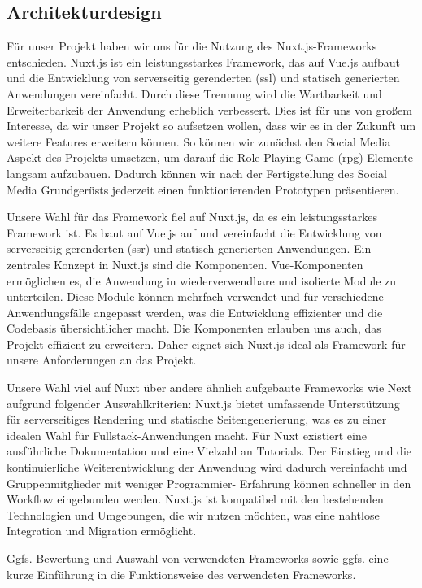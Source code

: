 \documentclass[a4paper,12pt]{article}
\begin{document}
\subsection{Architekturdesign}
Für unser Projekt haben wir uns für die Nutzung des Nuxt.js-Frameworks entschieden. Nuxt.js ist ein leistungsstarkes Framework, das auf Vue.js aufbaut und die Entwicklung von serverseitig gerenderten (\gls{ssl}) und statisch generierten Anwendungen vereinfacht. Durch diese Trennung wird die Wartbarkeit und Erweiterbarkeit der Anwendung erheblich verbessert. Dies ist für uns von großem Interesse, da wir unser Projekt so aufsetzen wollen, dass wir es in der Zukunft um weitere Features erweitern können. So können wir zunächst den Social Media Aspekt des Projekts umsetzen, um darauf die Role-Playing-Game (\gls{rpg}) Elemente langsam aufzubauen. Dadurch können wir nach der Fertigstellung des Social Media Grundgerüsts jederzeit einen funktionierenden Prototypen präsentieren.

Unsere Wahl für das Framework fiel auf Nuxt.js, da es ein leistungsstarkes Framework ist. Es baut auf Vue.js auf und vereinfacht die Entwicklung von serverseitig gerenderten (\gls{ssr}) und statisch generierten Anwendungen. Ein zentrales Konzept in Nuxt.js sind die Komponenten. Vue-Komponenten ermöglichen es, die Anwendung in wiederverwendbare und isolierte Module zu unterteilen. Diese Module können mehrfach verwendet und für verschiedene Anwendungsfälle angepasst werden, was die Entwicklung effizienter und die Codebasis übersichtlicher macht. Die Komponenten erlauben uns auch, das Projekt effizient zu erweitern. Daher eignet sich Nuxt.js ideal als Framework für unsere Anforderungen an das Projekt.

Unsere Wahl viel auf Nuxt über andere ähnlich aufgebaute Frameworks wie Next aufgrund folgender Auswahlkriterien: 
Nuxt.js bietet umfassende Unterstützung für serverseitiges Rendering und statische Seitengenerierung, was es zu einer idealen Wahl für Fullstack-Anwendungen macht.
Für Nuxt existiert eine ausführliche Dokumentation und eine Vielzahl an Tutorials. Der Einstieg und die kontinuierliche Weiterentwicklung der Anwendung wird dadurch vereinfacht und Gruppenmitglieder mit weniger Programmier- Erfahrung können schneller in den Workflow eingebunden werden. 
Nuxt.js ist kompatibel mit den bestehenden Technologien und Umgebungen, die wir nutzen möchten, was eine nahtlose Integration und Migration ermöglicht. 

Ggfs. Bewertung und Auswahl von verwendeten Frameworks sowie ggfs. eine kurze
Einführung in die Funktionsweise des verwendeten Frameworks.
\end{document}
